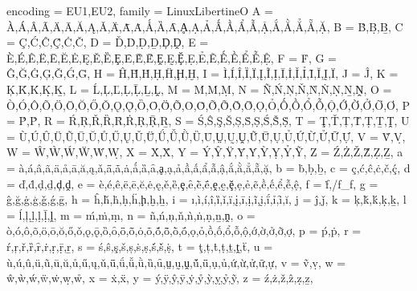 \DeclareCharacterInheritance
   { encoding = {EU1,EU2},
     family   = LinuxLibertineO }
   { A = {À,Á,Â,Ã,Ä,Ā,Ă,Ą,Ǎ,Ǟ,Ǡ,Ȧ,Ǻ,Ȁ,Ȃ,Ḁ,Ạ,Ả,Ấ,Ầ,Ẩ,Ẫ,Ậ,Ắ,Ằ,Ẳ,Ẵ,Ặ},
     B = {Ḃ,Ḅ,Ḇ},
     C = {Ç,Ć,Ĉ,Ḉ,Ċ,Č},
     D = {Ď,Ḋ,Ḍ,Ḏ,Ḑ,Ḓ},
     E = {È,É,Ê,Ë,Ē,Ĕ,Ė,Ę,Ě,Ȅ,Ȩ,Ȇ,Ḕ,Ḗ,Ḙ,Ḛ,Ḝ,Ẹ,Ẻ,Ẽ,Ế,Ề,Ể,Ễ,Ệ},
     F = {Ḟ},
     G = {Ĝ,Ğ,Ġ,Ģ,Ǧ,Ǵ,Ḡ},
     H = {Ĥ,Ȟ,Ḣ,Ḥ,Ḧ,Ḩ,Ḫ},
     I = {Ì,Í,Î,Ȉ,Ï,Į,Ĩ,Ị,Ī,İ,Ǐ,Ỉ,Ȋ,Ĭ,Ḭ,Ï},
     J = {Ĵ},
     K = {Ķ,Ǩ,Ḱ,Ḳ,Ḵ},
     L = {Ĺ,Ļ,Ľ,Ḷ,Ḹ,Ḻ,Ḽ}, %
     M = {Ḿ,Ṁ,Ṃ},
     N = {Ñ,Ń,Ņ,Ň,Ǹ,Ṅ,Ṇ,Ṉ,Ṋ},
     O = {Ò,Ó,Ô,Õ,Ö,Ō,Ŏ,Ő,Ǒ,Ǫ,Ǭ,Ȍ,Ȏ,Ȫ,Ȭ,Ȯ,Ȱ,Ṍ,Ṏ,Ṑ,Ṓ,Ọ,Ỏ,Ố,Ồ,Ổ,Ỗ,Ộ,Ớ,Ờ,Ở,Ỡ,Ơ},
     P = {Ṕ,Ṗ},
     R = {Ŕ,Ŗ,Ř,Ȑ,Ȓ,Ṙ,Ṛ,Ṝ,Ṟ},
     S = {Ś,Ŝ,Ş,Š,Ș,Ṡ,Ṣ,Ṥ,Ṧ,Ṩ},
     T = {Ţ,Ť,Ț,Ṫ,Ṭ,Ṯ,Ṱ},
     U = {Ù,Ú,Û,Ü,Ũ,Ū,Ŭ,Ů,Ű,Ų,Ǔ,Ǖ,Ǘ,Ǚ,Ǜ,Ȕ,Ȗ,Ṳ,Ṵ,Ṷ,Ṹ,Ṻ,Ụ,Ủ,Ứ,Ừ,Ử,Ữ,Ự},
     V = {Ṽ,Ṿ},
     W = {Ŵ,Ẁ,Ẃ,Ẅ,Ẇ,Ẉ},
     X = {Ẋ,Ẍ},
     Y = {Ý,Ŷ,Ÿ,Ȳ,Ẏ,Ỳ,Ỵ,Ỷ,Ỹ},
     Z = {Ź,Ż,Ž,Ẑ,Ẓ,Ẕ},
     a = {à,á,â,ã,ä,å,ā,ă,ą,ǎ,ǟ,ǡ,ȧ,ǻ,ȁ,ȃ,ḁ,ạ,ả,ầ,ấ,ẩ,ẫ,ậ,ắ,ằ,ẳ,ẵ,ặ}, %
     b = {ḃ,ḅ,ḇ},
     c = {ç,ć,ĉ,ċ,č,ḉ},
     d = {ď,ḋ,ḍ,ḏ,ḑ,ḓ},
     e = {è,é,ê,ë,ē,ĕ,ė,ę,ě,ȅ,ȩ,ȇ,ḕ,ḗ,ḙ,ḛ,ḝ,ẹ,ẻ,ẽ,ề,ế,ể,ễ,ệ},
     f = {ḟ,/f_f},
     g = {ĝ,ğ,ġ,ģ,ǧ,ǵ,ḡ},
     h = {ĥ,ȟ,ḣ,ḥ,ḧ,ḩ,ḫ,ẖ},
     i = {ı,ì,í,î,ȉ,ǐ,ï,į,ī,ị,ĩ,ḭ,ḯ,ỉ,ȋ,ĭ},
     j = {ĵ,ǰ},
     k = {ķ,ǩ,ḱ,ḳ,ḵ},
     l = {ĺ,ļ,ḻ,ḷ,ḹ,ḽ}, %
     m = {ḿ,ṁ,ṃ},
     n = {ñ,ń,ņ,ň,ǹ,ṅ,ṇ,ṉ,ṋ}, %
     o = {ò,ó,ô,õ,ö,ō,ŏ,ő,ǒ,ǫ,ǭ,ȍ,ȏ,ȫ,ȭ,ȯ,ȱ,ṍ,ṏ,ṑ,ṓ,ọ,ỏ,ồ,ố,ổ,ỗ,ộ,ớ,ờ,ở,ỡ,ợ},
     p = {ṕ,ṗ},
     r = {ŕ,ŗ,ř,ȑ,ȓ,ṙ,ṛ,ṝ,ṟ},
     s = {ś,ŝ,ş,š,ș,ṡ,ṣ,ṥ,ṧ,ṩ},
     t = {ţ,ț,ṫ,ṭ,ṯ,ṱ,ẗ}, %
     u = {ù,ú,û,ü,ũ,ū,ŭ,ů,ű,ų,ǔ,ǖ,ǘ,ǚ,ǜ,ȕ,ȗ,ṳ,ṵ,ṷ,ṹ,ṻ,ụ,ủ,ứ,ừ,ử,ữ,ự},
     v = {ṽ,ṿ},
     w = {ŵ,ẁ,ẃ,ẅ,ẇ,ẉ,ẘ},
     x = {ẋ,ẍ},
     y = {ý,ÿ,ŷ,ȳ,ẏ,ẙ,ỳ,ỵ,ỷ,ỹ},
     z = {ź,ż,ž,ẑ,ẓ,ẕ},
   }


